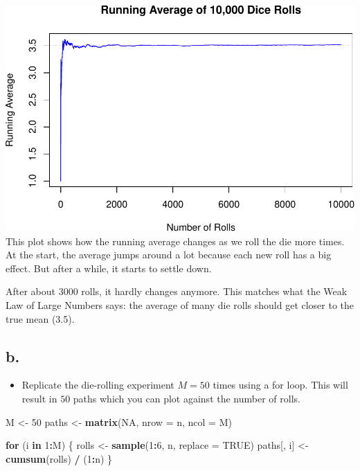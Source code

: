 \documentclass[
]{article}
\newenvironment{Shaded}{\begin{snugshade}}{\end{snugshade}}
\newcommand{\AttributeTok}[1]{\textcolor[rgb]{0.13,0.29,0.53}{#1}}
\newcommand{\ConstantTok}[1]{\textcolor[rgb]{0.56,0.35,0.01}{#1}}
\newcommand{\ControlFlowTok}[1]{\textcolor[rgb]{0.13,0.29,0.53}{\textbf{#1}}}
\newcommand{\DecValTok}[1]{\textcolor[rgb]{0.00,0.00,0.81}{#1}}
\newcommand{\FunctionTok}[1]{\textcolor[rgb]{0.13,0.29,0.53}{\textbf{#1}}}
\newcommand{\NormalTok}[1]{#1}
\newcommand{\OtherTok}[1]{\textcolor[rgb]{0.56,0.35,0.01}{#1}}
\newcommand{\SpecialCharTok}[1]{\textcolor[rgb]{0.81,0.36,0.00}{\textbf{#1}}}
\providecommand{\tightlist}{%
  \setlength{\itemsep}{0pt}\setlength{\parskip}{0pt}}
\begin{document}
\includegraphics{CS1_files/figure-latex/unnamed-chunk-11-1.pdf} This
plot shows how the running average changes as we roll the die more
times. At the start, the average jumps around a lot because each new
roll has a big effect. But after a while, it starts to settle down.

After about 3000 rolls, it hardly changes anymore. This matches what the
Weak Law of Large Numbers says: the average of many die rolls should get
closer to the true mean (3.5).

\subsection{b.}\label{b.-2}

\begin{itemize}
\tightlist
\item
  Replicate the die-rolling experiment \(M=50\) times using a for loop.
  This will result in \(50\) paths which you can plot against the number
  of rolls.
\end{itemize}

\begin{Shaded}
\begin{Highlighting}[]
\NormalTok{M }\OtherTok{\textless{}{-}} \DecValTok{50}
\NormalTok{paths }\OtherTok{\textless{}{-}} \FunctionTok{matrix}\NormalTok{(}\ConstantTok{NA}\NormalTok{, }\AttributeTok{nrow =}\NormalTok{ n, }\AttributeTok{ncol =}\NormalTok{ M)}

\ControlFlowTok{for}\NormalTok{ (i }\ControlFlowTok{in} \DecValTok{1}\SpecialCharTok{:}\NormalTok{M) \{}
\NormalTok{  rolls }\OtherTok{\textless{}{-}} \FunctionTok{sample}\NormalTok{(}\DecValTok{1}\SpecialCharTok{:}\DecValTok{6}\NormalTok{, n, }\AttributeTok{replace =} \ConstantTok{TRUE}\NormalTok{)}
\NormalTok{  paths[, i] }\OtherTok{\textless{}{-}} \FunctionTok{cumsum}\NormalTok{(rolls) }\SpecialCharTok{/}\NormalTok{ (}\DecValTok{1}\SpecialCharTok{:}\NormalTok{n)}
\NormalTok{\}}
\end{Highlighting}
\end{Shaded}
\end{document}
